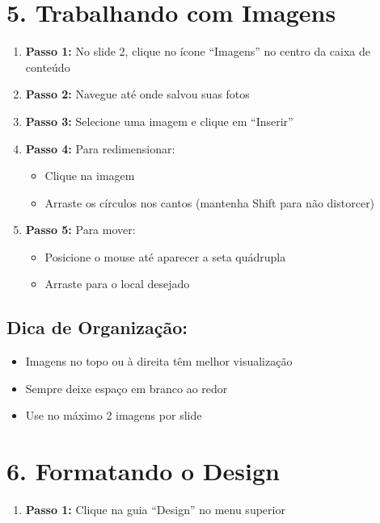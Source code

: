 \documentclass[11pt]{article}
\begin{document}
\begin{multicols}{2}

\section*{5. Trabalhando com Imagens}

\begin{enumerate}
\item \textbf{Passo 1:} No slide 2, clique no ícone ``Imagens'' no centro da caixa de conteúdo

\item \textbf{Passo 2:} Navegue até onde salvou suas fotos

\item \textbf{Passo 3:} Selecione uma imagem e clique em ``Inserir''

\item \textbf{Passo 4:} Para redimensionar:
\begin{itemize}
\item Clique na imagem
\item Arraste os círculos nos cantos (mantenha Shift para não distorcer)
\end{itemize}

\item \textbf{Passo 5:} Para mover:
\begin{itemize}
\item Posicione o mouse até aparecer a seta quádrupla
\item Arraste para o local desejado
\end{itemize}
\end{enumerate}

\subsection*{Dica de Organização:}
\begin{itemize}
\item Imagens no topo ou à direita têm melhor visualização
\item Sempre deixe espaço em branco ao redor
\item Use no máximo 2 imagens por slide
\end{itemize}

\section*{6. Formatando o Design}

\begin{enumerate}
\item \textbf{Passo 1:} Clique na guia ``Design'' no menu superior


\end{enumerate}
\end{multicols}
\end{document}
